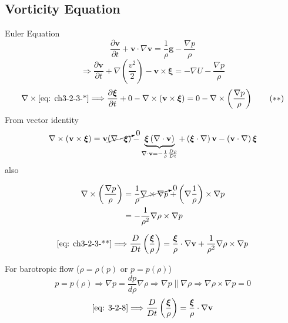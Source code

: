 \subsection{Vorticity Equation}
Euler Equation
\[
\frac{\partial\mathbf{v}}{\partial t} + \mathbf{v}\cdot\nabla\mathbf{v} = \frac{1}{\rho}\mathbf{g} - \frac{\nabla p}{\rho}
\]
\begin{equation}
\Longrightarrow
\frac{\partial\mathbf{v}}{\partial t} + \nabla\left(\frac{v^2}{2}\right) - \mathbf{v}\times\boldsymbol{\xi} = -\nabla U - \frac{\nabla p}{\rho}
\tag{$\ast$}
\label{eq: ch3-2-3-*}
\end{equation}
\begin{equation}
\nabla\times\eqref{eq: ch3-2-3-*}\Longrightarrow\frac{\partial\boldsymbol{\xi}}{\partial t} + 0 - \nabla\times\left(\mathbf{v}\times\boldsymbol{\xi}\right) = 0 - \nabla\times\left(\frac{\nabla p}{\rho}\right)
\tag{$\ast\ast$}
\label{eq: ch3-2-3-**}
\end{equation}
From vector identity
\[
\nabla\times\left(\mathbf{v}\times\boldsymbol{\xi}\right) = \mathbf{v}\cancelto{0}{\left(\nabla\cdot\boldsymbol{\xi}\right)} - \underbrace{\boldsymbol{\xi}\left(\nabla\cdot\mathbf{v}\right)}_{\nabla\cdot\mathbf{v}=-\frac{1}{\rho}\frac{D\rho}{Dt}} + \left(\boldsymbol{\xi}\cdot\nabla\right)\mathbf{v} - \left(\mathbf{v}\cdot\nabla\right)\boldsymbol{\xi}
\]
also
\begin{exercise}
\begin{align*}
\nabla\times\left(\frac{\nabla p}{\rho}\right) 
&= \frac{1}{\rho}\cancelto{0}{\nabla\times\nabla p} + \left(\nabla\frac{1}{\rho}\right)\times\nabla p \\
&= -\frac{1}{\rho^2}\nabla \rho\times\nabla p
\end{align*}
\end{exercise}
\begin{exercise}
\begin{equation}
\eqref{eq: ch3-2-3-**}\Longrightarrow
\frac{D}{Dt}\left(\frac{\boldsymbol{\xi}}{\rho}\right) = \frac{\boldsymbol{\xi}}{\rho}\cdot\nabla\mathbf{v} + \frac{1}{\rho^2}\nabla\rho\times\nabla p
\label{eq: 3-2-8}
\end{equation}
\end{exercise}
For barotropic flow ($\rho=\rho (p)$ or $p=p(\rho)$)
\[
p = p(\rho)\Longrightarrow\nabla p = \frac{dp}{d\rho}\nabla\rho\Longrightarrow\nabla p\parallel\nabla\rho\Longrightarrow\nabla\rho\times\nabla p = 0
\]
\begin{equation}
\eqref{eq: 3-2-8}\Longrightarrow\frac{D}{Dt}\left(\frac{\boldsymbol{\xi}}{\rho}\right) = \frac{\boldsymbol{\xi}}{\rho}\cdot\nabla\mathbf{v}
\label{eq: 3-2-9}
\end{equation}

